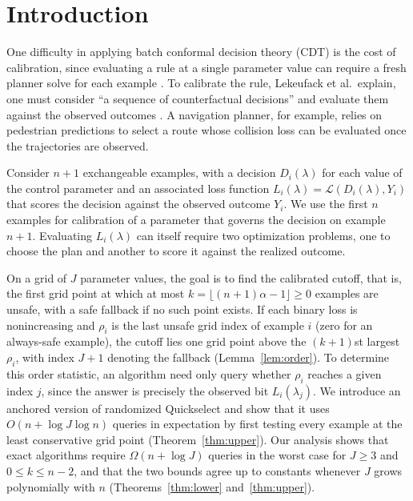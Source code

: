 \documentclass[a4paper,10pt]{article}
\theoremstyle{plain}
\theoremstyle{remark}
\begin{document}
\section{Introduction}\label{sec:intro}

One difficulty in applying batch conformal decision theory (CDT) is the cost of calibration, since evaluating a rule at a single parameter value can require a fresh planner solve for each example \cite{cdt}. To calibrate the rule, Lekeufack et al.\ explain, one must consider \textquotedblleft{}a sequence of counterfactual decisions\textquotedblright{} and evaluate them against the observed outcomes \cite{cdt}. A navigation planner, for example, relies on pedestrian predictions to select a route whose collision loss can be evaluated once the trajectories are observed.

Consider $n+1$ exchangeable examples, with a decision $D_i(\lambda)$ for each value of the control parameter and an associated loss function $L_i(\lambda)=\mathcal L(D_i(\lambda),Y_i)$ that scores the decision against the observed outcome $Y_i$. We use the first $n$ examples for calibration of a parameter that governs the decision on example $n+1$. Evaluating $L_i(\lambda)$ can itself require two optimization problems, one to choose the plan and another to score it against the realized outcome.

On a grid of $J$ parameter values, the goal is to find the calibrated cutoff, that is, the first grid point at which at most $k=\lfloor(n+1)\alpha-1\rfloor\ge0$ examples are unsafe, with a safe fallback if no such point exists. If each binary loss is nonincreasing and $\rho_i$ is the last unsafe grid index of example $i$ (zero for an always-safe example), the cutoff lies one grid point above the $(k+1)$st largest $\rho_i$, with index $J+1$ denoting the fallback (Lemma~\ref{lem:order}). To determine this order statistic, an algorithm need only query whether $\rho_i$ reaches a given index $j$, since the answer is precisely the observed bit $L_i(\lambda_j)$. We introduce an anchored version of randomized Quickselect and show that it uses $O(n+\log J\log n)$ queries in expectation by first testing every example at the least conservative grid point (Theorem~\ref{thm:upper}). Our analysis shows that exact algorithms require $\Omega(n+\log J)$ queries in the worst case for $J\ge3$ and $0\le k\le n-2$, and that the two bounds agree up to constants whenever $J$ grows polynomially with $n$ (Theorems~\ref{thm:lower} and~\ref{thm:upper}).
\end{document}
